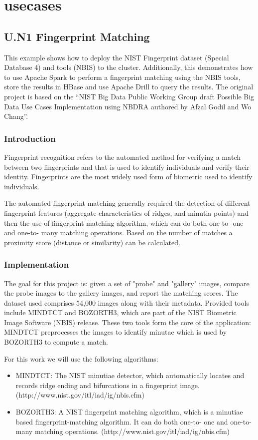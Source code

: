 \section{usecases}
\subsection{U.N1 Fingerprint Matching}

This example shows how to deploy the NIST Fingerprint dataset (Special Database
4) and tools (NBIS) to the cluster. Additionally, this demonstrates how to use
Apache Spark to perform a fingerprint matching using the NBIS tools, store the
results in HBase and use Apache Drill to query the results. The original
project is based on the “NIST Big Data Public Working Group draft Possible Big
Data Use Cases Implementation using NBDRA authored by Afzal Godil and Wo
Chang”.

\subsubsection{Introduction}
Fingerprint recognition refers to the automated method for verifying a match
between two fingerprints and that is used to identify individuals and verify
their identity. Fingerprints are the most widely used form of biometric used to
identify individuals.

The automated fingerprint matching generally required the detection of
different fingerprint features (aggregate characteristics of ridges, and
minutia points) and then the use of fingerprint matching algorithm, which can
do both one-to- one and one-to- many matching operations. Based on the number
of matches a proximity score (distance or similarity) can be calculated.

\subsubsection{Implementation}
The goal for this project is: given a set of "probe" and "gallery" images,
compare the probe images to the gallery images, and report the matching scores.
The dataset used comprises 54,000 images along with their metadata. Provided
tools include MINDTCT and BOZORTH3, which are part of the NIST Biometric Image
Software (NBIS) release. These two tools form the core of the application:
MINDTCT preprocesses the images to identify minutae which is used by BOZORTH3
to compute a match.  

For this work we will use the following algorithms:
\begin{itemize}
\item
MINDTCT: The NIST minutiae detector, which automatically locates and records
ridge ending and bifurcations in a fingerprint image.
(http://www.nist.gov/itl/iad/ig/nbis.cfm)

\item
BOZORTH3: A NIST fingerprint matching algorithm, which is a minutiae based
fingerprint-matching algorithm. It can do both one-to- one and one-to- many
matching operations. (http://www.nist.gov/itl/iad/ig/nbis.cfm)
\end{itemize}

